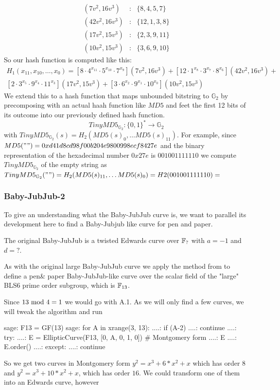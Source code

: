 $$
\begin{array}{lcl}
(7v^2 , 16v^3 ) &:& \{8,4,5,7\}\\
(42v^2 , 16v^3 ) &:& \{12,1,3,8\}\\
(17v^2 , 15v^3 ) &:& \{2,3,9,11\}\\
(10v^2 , 15v^3 ) &:& \{3,6,9,10\}
\end{array}
$$
So our hash function is computed like this:
\begin{multline*}
H_1(x_{11},x_{10},\ldots, x_{0})=
[8\cdot 4^{x_{11}}\cdot 5^{x_{10}}\cdot 7^{x_9}](7v^2 , 16v^3)+
[12\cdot 1^{x_8}\cdot 3^{x_7}\cdot 8^{x_6}](42v^2 , 16v^3 )+\\
[2\cdot 3^{x_5}\cdot 9^{x_4}\cdot 11^{x_3}](17v^2 , 15v^3 ) +
[3\cdot 6^{x_2}\cdot 9^{x_{1}}\cdot 10^{x_{0}}](10v^2 , 15v^3 )
\end{multline*}
We extend this to a hash function that maps unbounded bitstring to $\mathbb{G}_2$ by precomposing with an actual haah function like $MD5$ and feet the first 12 bits of its outcome into our previously defined hash function. 
$$
TinyMD5_{\mathbb{G}_2}: \{0,1\}^* \to \mathbb{G}_2
$$
with $TinyMD5_{\mathbb{G}_2}(s)= H_2(MD5(s)_0,\ldots MD5(s)_{11})$. For example, since 
$MD5("")= 0xd41d8cd98f00b204e9800998ecf8427e$ and the binary representation of the hexadecimal number $0x27e$ is $001001111110$ we compute $TinyMD5_{\mathbb{G}_2}$ of the empty string as
$TinyMD5_{\mathbb{G}_2}("")= H_2(MD5(s)_{11},\ldots MD5(s)_{0}) = H2(001001111110)=$

\subsubsection{Baby-JubJub-2}
To give an understanding what the Baby-JubJub curve is, we want to parallel its development here to find a Baby-Jubjub like curve for pen and paper.

The original Baby-JubJub is a twisted Edwards curve over $\mathbb{F}_{?}$ with $a=-1$ and $d=?.$

As with the original large Baby-JubJub curve we apply the method from
to define a pen\& paper Baby-JubJub-like curve over the scalar field of the "large" BLS6 prime order subgroup, which is $\mathbb{F}_{13}$. 

Since $13 \text{ mod } 4=1$ we would go with A.1. As we will only find a few curves, we will tweak the algorithm and run
\begin{sagecommandline}
sage: F13 = GF(13) 
sage: for A in xrange(3, 13):
....:     if (A-2) %
....:         continue
....:     try:
....:         E = EllipticCurve(F13, [0, A, 0, 1, 0]) # Montgomery form
....:         E
....:         E.order()
....:     except:               
....:         continue      
\end{sagecommandline}
So we get two curves in Montgomery form $y^2 = x^3 + 6*x^2 + x$ which has order $8$ and  $y^2 = x^3 + 10*x^2 + x$, which has order $16$. We could transform one of them into an Edwards curve, however   

